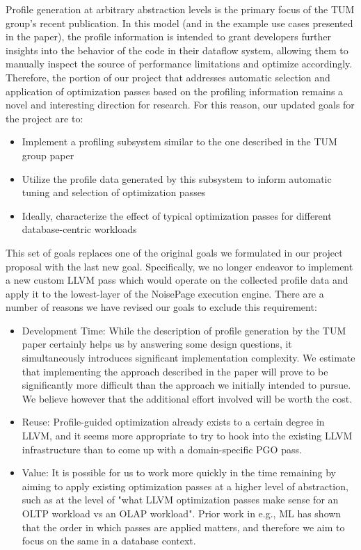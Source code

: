 \documentclass{vldb}
\begin{document}
Profile generation at arbitrary abstraction levels is the primary focus of the TUM group's recent publication. In this model (and in the example use cases presented in the paper), the profile information is intended to grant developers further insights into the behavior of the code in their dataflow system, allowing them to manually inspect the source of performance limitations and optimize accordingly. Therefore, the portion of our project that addresses automatic selection and application of optimization passes based on the profiling information remains a novel and interesting direction for research. For this reason, our updated goals for the project are to:

\begin{itemize}
    \item Implement a profiling subsystem similar to the one described in the TUM group paper
    \item Utilize the profile data generated by this subsystem to inform automatic tuning and selection of optimization passes
    \item Ideally, characterize the effect of typical optimization passes for different database-centric workloads
\end{itemize}

This set of goals replaces one of the original goals we formulated in our project proposal with the last new goal. Specifically, we no longer endeavor to implement a new custom LLVM pass which would operate on the collected profile data and apply it to the lowest-layer of the NoisePage \cite{noisepage} execution engine. There are a number of reasons we have revised our goals to exclude this requirement:

\begin{itemize}
    \item Development Time: While the description of profile generation by the TUM paper certainly helps us by answering some design questions, it simultaneously introduces significant implementation complexity. We estimate that implementing the approach described in the paper will prove to be significantly more difficult than the approach we initially intended to pursue. We believe however that the additional effort involved will be worth the cost.
    \item Reuse: Profile-guided optimization already exists to a certain degree in LLVM, and it seems more appropriate to try to hook into the existing LLVM infrastructure than to come up with a domain-specific PGO pass.
    \item Value: It is possible for us to work more quickly in the time remaining by aiming to apply existing optimization passes at a higher level of abstraction, such as at the level of "what LLVM optimization passes make sense for an OLTP workload vs an OLAP workload". Prior work in e.g., ML has shown that the order in which passes are applied matters, and therefore we aim to focus on the same in a database context.
\end{itemize}
\end{document}
